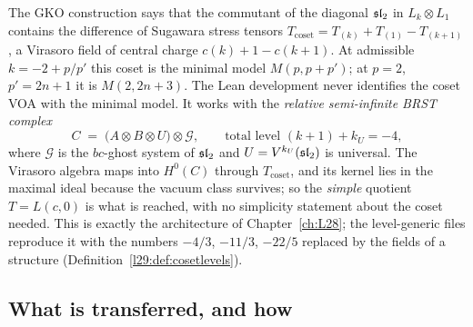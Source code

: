 The GKO construction says that the commutant of the diagonal $\mathfrak{sl}_2$ in $L_k\otimes L_1$ contains the
difference of Sugawara stress tensors $T_{\mathrm{coset}}=T_{(k)}+T_{(1)}-T_{(k+1)}$, a Virasoro field of central
charge $c(k)+1-c(k+1)$. At admissible $k=-2+p/p'$ this coset is the minimal model $M(p,p+p')$; at $p=2$,
$p'=2n+1$ it is $M(2,2n+3)$. The Lean development never identifies the coset VOA with the minimal model. It works
with the \emph{relative semi-infinite BRST complex}
\begin{equation}\label{l29:eq:brst}
C\;=\;\bigl(A\otimes B\otimes U\bigr)\otimes\mathcal G,\qquad \text{total level }(k+1)+k_U=-4,
\end{equation}
where $\mathcal G$ is the $bc$-ghost system of $\mathfrak{sl}_2$ and $U=V^{k_U}(\mathfrak{sl}_2)$ is universal. The
Virasoro algebra maps into $H^0(C)$ through $T_{\mathrm{coset}}$, and its kernel lies in the maximal ideal because
the vacuum class survives; so the \emph{simple} quotient $T=L(c,0)$ is what is reached, with no simplicity statement
about the coset needed. This is exactly the architecture of Chapter~\ref{ch:L28}; the level-generic files
reproduce it with the numbers $-4/3$, $-11/3$, $-22/5$ replaced by the fields of a structure
(Definition~\ref{l29:def:cosetlevels}).

\subsection{What is transferred, and how}\label{l29:sec:howtransfer}

